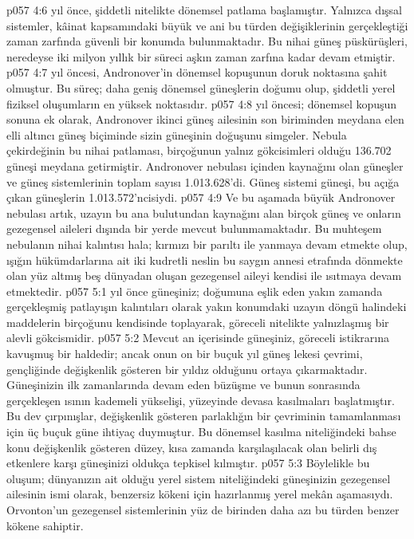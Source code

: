 \vs p057 4:6  yıl önce, şiddetli nitelikte dönemsel patlama başlamıştır. Yalnızca dışsal sistemler, kâinat kapsamındaki büyük ve ani bu türden değişiklerinin gerçekleştiği zaman zarfında güvenli bir konumda bulunmaktadır. Bu nihai güneş püskürüşleri, neredeyse iki milyon yıllık bir süreci aşkın zaman zarfına kadar devam etmiştir.
\vs p057 4:7  yıl öncesi, Andronover’in dönemsel kopuşunun doruk noktasına şahit olmuştur. Bu süreç; daha geniş dönemsel güneşlerin doğumu olup, şiddetli yerel fiziksel oluşumların en yüksek noktasıdır.
\vs p057 4:8  yıl öncesi; dönemsel kopuşun sonuna ek olarak, Andronover ikinci güneş ailesinin son biriminden meydana elen elli altıncı güneş biçiminde sizin güneşinin doğuşunu simgeler. Nebula çekirdeğinin bu nihai patlaması, birçoğunun yalnız gökcisimleri olduğu 136.702 güneşi meydana getirmiştir. Andronover nebulası içinden kaynağını olan güneşler ve güneş sistemlerinin toplam sayısı 1.013.628’di. Güneş sistemi güneşi, bu açığa çıkan güneşlerin 1.013.572’ncisiydi.
\vs p057 4:9 Ve bu aşamada büyük Andronover nebulası artık, uzayın bu ana bulutundan kaynağını alan birçok güneş ve onların gezegensel aileleri dışında bir yerde mevcut bulunmamaktadır. Bu muhteşem nebulanın nihai kalıntısı hala; kırmızı bir parıltı ile yanmaya devam etmekte olup, ışığın hükümdarlarına ait iki kudretli neslin bu saygın annesi etrafında dönmekte olan yüz altmış beş dünyadan oluşan gezegensel aileyi kendisi ile ısıtmaya devam etmektedir.
\vs p057 5:1  yıl önce güneşiniz; doğumuna eşlik eden yakın zamanda gerçekleşmiş patlayışın kalıntıları olarak yakın konumdaki uzayın döngü halindeki maddelerin birçoğunu kendisinde toplayarak, göreceli nitelikte yalnızlaşmış bir alevli gökcismidir.
\vs p057 5:2 Mevcut an içerisinde güneşiniz, göreceli istikrarına kavuşmuş bir haldedir; ancak onun on bir buçuk yıl güneş lekesi çevrimi, gençliğinde değişkenlik gösteren bir yıldız olduğunu ortaya çıkarmaktadır. Güneşinizin ilk zamanlarında devam eden büzüşme ve bunun sonrasında gerçekleşen ısının kademeli yükselişi, yüzeyinde devasa kasılmaları başlatmıştır. Bu dev çırpınışlar, değişkenlik gösteren parlaklığın bir çevriminin tamamlanması için üç buçuk güne ihtiyaç duymuştur. Bu dönemsel kasılma niteliğindeki bahse konu değişkenlik gösteren düzey, kısa zamanda karşılaşılacak olan belirli dış etkenlere karşı güneşinizi oldukça tepkisel kılmıştır.
\vs p057 5:3 Böylelikle bu oluşum; dünyanızın ait olduğu yerel sistem niteliğindeki güneşinizin gezegensel ailesinin ismi olarak,  benzersiz kökeni için hazırlanmış yerel mekân aşamasıydı. Orvonton’un gezegensel sistemlerinin yüz de birinden daha azı bu türden benzer kökene sahiptir.
